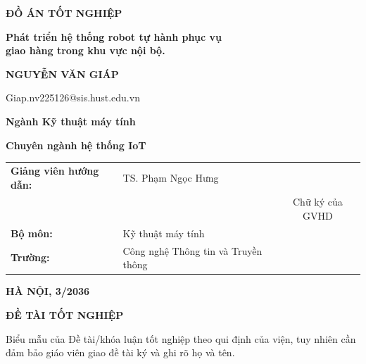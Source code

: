 \documentclass[12pt,a4paper]{report} %
\begin{document}
	
	\begin{titlepage}
		\centering
		\vspace*{2cm}
		
		{\Huge \textbf{ĐỒ ÁN TỐT NGHIỆP}}\par
		\vspace{0.5cm}
		{\LARGE \textbf{Phát triển hệ thống robot tự hành phục vụ\\ giao hàng trong khu vực nội bộ.}}\par
		\vspace{2cm}
		
		{\large \textbf{NGUYỄN VĂN GIÁP}}\par
		\vspace{0.2cm}
		{\normalsize Giap.nv225126@sis.hust.edu.vn}\par
		\vspace{0.8cm}
		{\large \textbf{Ngành Kỹ thuật máy tính}}\par
		\vspace{0.2cm}
		{\large \textbf{Chuyên ngành hệ thống IoT}}\par
		\vspace{3.5cm}
		
		\begin{center}
			\renewcommand{\arraystretch}{1.5}
			\begin{tabular}{@{}llc@{}}
				\textbf{Giảng viên hướng dẫn:} & TS. Phạm Ngọc Hưng \hspace{1cm} & \makebox[4cm]{\hrulefill} \\[-0.3cm]
				& & \scriptsize Chữ ký của GVHD \\
				\textbf{Bộ môn:} & Kỹ thuật máy tính & \\
				\textbf{Trường:} & Công nghệ Thông tin và Truyền thông & \\
			\end{tabular}
		\end{center}
		
		\vfill
		\textbf{\large HÀ NỘI, 3/2036}
	\end{titlepage}
	
	\newpage
	
	\newpage
    \begin{center}
        \textbf{\Large ĐỀ TÀI TỐT NGHIỆP} %
    \end{center}

    \vspace{0.5cm}

    \noindent Biểu mẫu của Đề tài/khóa luận tốt nghiệp theo qui định của viện, tuy nhiên cần đảm bảo giáo viên giao đề tài ký và ghi rõ họ và tên. 
\end{document}
